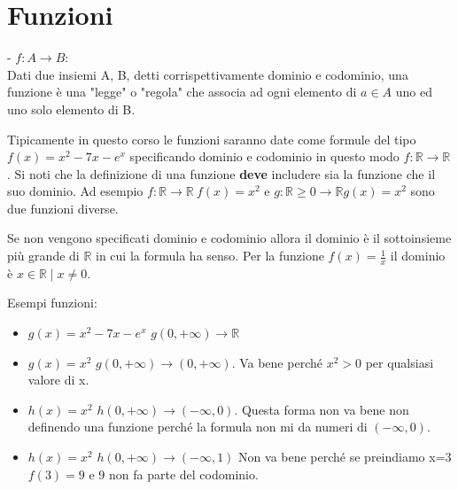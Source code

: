\newpage
\section{Funzioni}
\begin{definition}[Funzione]
- $f: A \longrightarrow B$: \\
Dati due insiemi A, B, detti corrispettivamente dominio e codominio, una funzione è una "legge" o "regola" che associa ad ogni elemento di $a \in A$ uno ed uno solo elemento di B.
\end{definition}
\begin{note}
Tipicamente in questo corso le funzioni saranno date come formule del tipo $f(x) = x^2 - 7x - e^x$ specificando dominio e codominio in questo modo $f: \mathbb{R} \longrightarrow \mathbb{R}$. Si noti che la definizione di una funzione \textbf{deve} includere sia la funzione che il suo dominio. Ad esempio $f: \mathbb{R} \longrightarrow \mathbb{R} \: f(x)=x^2$ e $g: \mathbb{R} \geq 0 \longrightarrow \mathbb{R} g(x)=x^2$ sono due funzioni diverse.
\end{note}
\begin{note}
	Se non vengono specificati dominio e codominio allora il dominio è il sottoinsieme più grande di $\mathbb{R}$ in cui la formula ha senso. Per la funzione $f(x)=\frac{1}{x}$ il dominio è ${x \in \mathbb{R} \mid x \neq 0}$.
\end{note}
\begin{example}
    Esempi funzioni:
    \begin{itemize}
        \item $g(x) = x^2 - 7x - e^x$ \hspace{.3cm} $g(0,+\infty) \longrightarrow \mathbb{R}$
        \item $g(x) = x^2$ \hspace{.3cm} $g(0, +\infty) \longrightarrow (0, +\infty)$. \hspace{.3cm}Va bene perché $x^2 > 0$ per qualsiasi valore di x.
        \item $h(x) = x^2$ \hspace{.3cm} $h(0, +\infty) \longrightarrow (-\infty, 0)$. \hspace{.3cm}Questa forma non va bene non definendo una funzione perché la formula non mi da numeri di $(-\infty, 0)$.
        \item $h(x) = x^2$ \hspace{.3cm} $h(0, +\infty) \longrightarrow (-\infty,1)$ \hspace{.3cm}Non va bene perché se preindiamo x=3 $f(3) = 9$ e 9 non fa parte del codominio. 
    \end{itemize}
\end{example}

